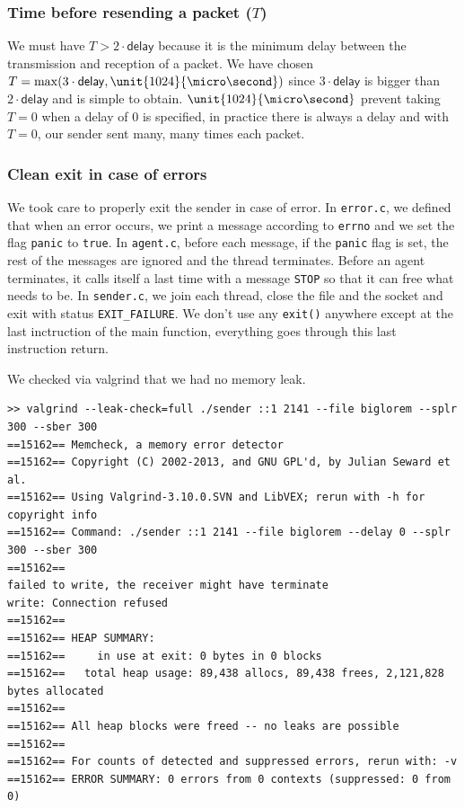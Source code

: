 \documentclass[10pt,a4paper]{article}
\begin{document}
\subsubsection{Time before resending a packet ($T$)}
We must have $T > 2 \cdot \mathsf{delay}$ because it is the minimum delay between the transmission and reception of a packet.
We have chosen $T = \max(3 \cdot \mathsf{delay}, \unit{1024}{\micro\second})$ since $3 \cdot \mathsf{delay}$ is bigger than $2 \cdot \mathsf{delay}$ and is simple to obtain.
$\unit{1024}{\micro\second}$ prevent taking $T = 0$ when a delay of $0$ is specified,
in practice there is always a delay and with $T = 0$, our sender sent many, many times each packet.

\subsubsection{Clean exit in case of errors}
We took care to properly exit the sender in case of error. In \lstinline|error.c|, we defined that when an error occurs, we print a message according to \lstinline|errno|
and we set the flag \lstinline|panic| to \lstinline|true|. In \lstinline|agent.c|, before each message, if the \lstinline|panic| flag is set, the rest of the messages are ignored and the thread terminates.
Before an agent terminates, it calls itself a last time with a message \lstinline|STOP| so that it can free what needs to be.
In \lstinline|sender.c|, we join each thread, close the file and the socket and exit with status \lstinline|EXIT_FAILURE|. We don't use any \texttt{exit()} anywhere except at the last inctruction of the main function, everything goes through this last instruction return.

We checked via valgrind that we had no memory leak.
\begin{lstlisting}[basicstyle=\ttfamily, basicstyle=\scriptsize]
>> valgrind --leak-check=full ./sender ::1 2141 --file biglorem --splr 300 --sber 300
==15162== Memcheck, a memory error detector
==15162== Copyright (C) 2002-2013, and GNU GPL'd, by Julian Seward et al.
==15162== Using Valgrind-3.10.0.SVN and LibVEX; rerun with -h for copyright info
==15162== Command: ./sender ::1 2141 --file biglorem --delay 0 --splr 300 --sber 300
==15162==
failed to write, the receiver might have terminate
write: Connection refused
==15162==
==15162== HEAP SUMMARY:
==15162==     in use at exit: 0 bytes in 0 blocks
==15162==   total heap usage: 89,438 allocs, 89,438 frees, 2,121,828 bytes allocated
==15162==
==15162== All heap blocks were freed -- no leaks are possible
==15162==
==15162== For counts of detected and suppressed errors, rerun with: -v
==15162== ERROR SUMMARY: 0 errors from 0 contexts (suppressed: 0 from 0)
\end{lstlisting}
\end{document}
